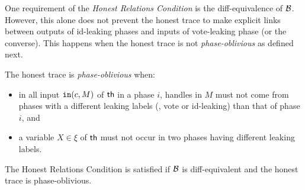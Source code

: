 One requirement of the {\em Honest Relations Condition}
is the diff-equivalence of $\mathcal{B}$.
However, this alone does not prevent the honest trace to make
explicit links between outputs of id-leaking phases and inputs of
vote-leaking phase (or the converse). This happens
when the honest trace is not {\em phase-oblivious} as defined next.
\begin{definition}
  The honest trace is {\em phase-oblivious} when:
  \begin{itemize}
  \item in all input $\mathtt{in}(c,M)$ of $\mathsf{th}$ in a phase $i$, handles in
    $M$ must not come from phases with a different leaking labels (\ie,
    vote or id-leaking) than that of phase $i$, and
  \item a variable $X\in\xi$ of $\mathsf{th}$ must not occur in two phases having
    different leaking labels.
  \end{itemize}
\end{definition}
%

\begin{condi}
  The Honest Relations Condition is satisfied if $\mathcal{B}$ is diff-equivalent
  and the honest trace is phase-oblivious.
\end{condi}




